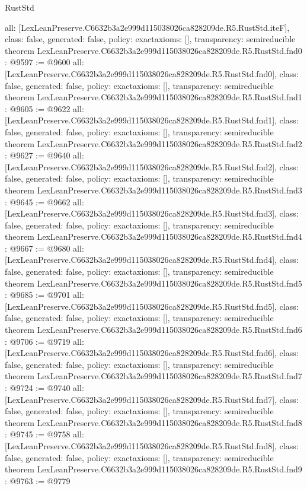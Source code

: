 \begin{lexlean}{RustStd}
\begin{coremodule}
{  all: [LexLeanPreserve.C6632b3a2e999d115038026ca828209de.R5.RustStd.iteF],
  class: false,
  generated: false,
  policy: exact{axioms: []},
  transparency: semireducible
}
theorem LexLeanPreserve.C6632b3a2e999d115038026ca828209de.R5.RustStd.fnd0 : @9597 := @9600 {
  all: [LexLeanPreserve.C6632b3a2e999d115038026ca828209de.R5.RustStd.fnd0],
  class: false,
  generated: false,
  policy: exact{axioms: []},
  transparency: semireducible
}
theorem LexLeanPreserve.C6632b3a2e999d115038026ca828209de.R5.RustStd.fnd1 : @9605 := @9622 {
  all: [LexLeanPreserve.C6632b3a2e999d115038026ca828209de.R5.RustStd.fnd1],
  class: false,
  generated: false,
  policy: exact{axioms: []},
  transparency: semireducible
}
theorem LexLeanPreserve.C6632b3a2e999d115038026ca828209de.R5.RustStd.fnd2 : @9627 := @9640 {
  all: [LexLeanPreserve.C6632b3a2e999d115038026ca828209de.R5.RustStd.fnd2],
  class: false,
  generated: false,
  policy: exact{axioms: []},
  transparency: semireducible
}
theorem LexLeanPreserve.C6632b3a2e999d115038026ca828209de.R5.RustStd.fnd3 : @9645 := @9662 {
  all: [LexLeanPreserve.C6632b3a2e999d115038026ca828209de.R5.RustStd.fnd3],
  class: false,
  generated: false,
  policy: exact{axioms: []},
  transparency: semireducible
}
theorem LexLeanPreserve.C6632b3a2e999d115038026ca828209de.R5.RustStd.fnd4 : @9667 := @9680 {
  all: [LexLeanPreserve.C6632b3a2e999d115038026ca828209de.R5.RustStd.fnd4],
  class: false,
  generated: false,
  policy: exact{axioms: []},
  transparency: semireducible
}
theorem LexLeanPreserve.C6632b3a2e999d115038026ca828209de.R5.RustStd.fnd5 : @9685 := @9701 {
  all: [LexLeanPreserve.C6632b3a2e999d115038026ca828209de.R5.RustStd.fnd5],
  class: false,
  generated: false,
  policy: exact{axioms: []},
  transparency: semireducible
}
theorem LexLeanPreserve.C6632b3a2e999d115038026ca828209de.R5.RustStd.fnd6 : @9706 := @9719 {
  all: [LexLeanPreserve.C6632b3a2e999d115038026ca828209de.R5.RustStd.fnd6],
  class: false,
  generated: false,
  policy: exact{axioms: []},
  transparency: semireducible
}
theorem LexLeanPreserve.C6632b3a2e999d115038026ca828209de.R5.RustStd.fnd7 : @9724 := @9740 {
  all: [LexLeanPreserve.C6632b3a2e999d115038026ca828209de.R5.RustStd.fnd7],
  class: false,
  generated: false,
  policy: exact{axioms: []},
  transparency: semireducible
}
theorem LexLeanPreserve.C6632b3a2e999d115038026ca828209de.R5.RustStd.fnd8 : @9745 := @9758 {
  all: [LexLeanPreserve.C6632b3a2e999d115038026ca828209de.R5.RustStd.fnd8],
  class: false,
  generated: false,
  policy: exact{axioms: []},
  transparency: semireducible
}
theorem LexLeanPreserve.C6632b3a2e999d115038026ca828209de.R5.RustStd.fnd9 : @9763 := @9779 {
}
\end{coremodule}
\end{lexlean}
